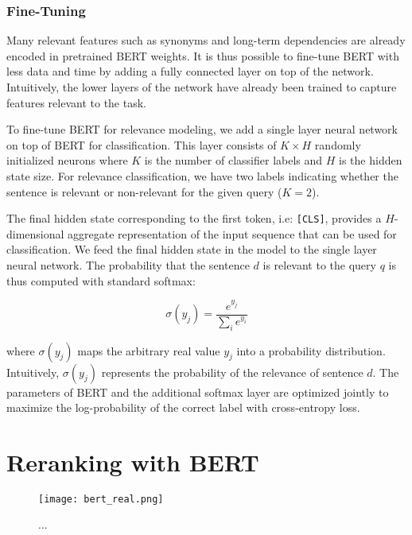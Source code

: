\subsubsection{Fine-Tuning}

Many relevant features such as synonyms and long-term dependencies are already encoded in pretrained BERT weights.
It is thus possible to fine-tune BERT with less data and time by adding a fully connected layer on top of the network.
Intuitively, the lower layers of the network have already been trained to capture features relevant to the task.

To fine-tune BERT for relevance modeling, we add a single layer neural network on top of BERT for classification.
This layer consists of $ K \times H $ randomly initialized neurons where $ K $ is the number of classifier labels and $ H$ is the hidden state size.
For relevance classification, we have two labels indicating whether the sentence is relevant or non-relevant for the given query ($ K = 2 $).

The final hidden state corresponding to the first token, i.e: \texttt{[CLS]}, provides a $ H $-dimensional aggregate representation of the input sequence that can be used for classification.
We feed the final hidden state in the model to the single layer neural network.
The probability that the sentence $d$ is relevant to the query $q$ is thus computed with standard softmax:

\begin{equation}
\sigma (y_j) = \frac{e^{y_j}}{\sum_i e^{y_i}}
\end{equation}

where $\sigma (y_j)$ maps the arbitrary real value $y_j$ into a probability distribution.
Intuitively, $\sigma (y_j)$ represents the probability of the relevance of sentence $d$.
The parameters of BERT and the additional softmax layer are optimized jointly to maximize the log-probability of the correct label with cross-entropy loss.

\section{Reranking with BERT}

\begin{figure}[b!]
\centering
  \texttt{[image: bert\_real.png]}
\caption{...}
\label{fig:bert_real}
\end{figure}

